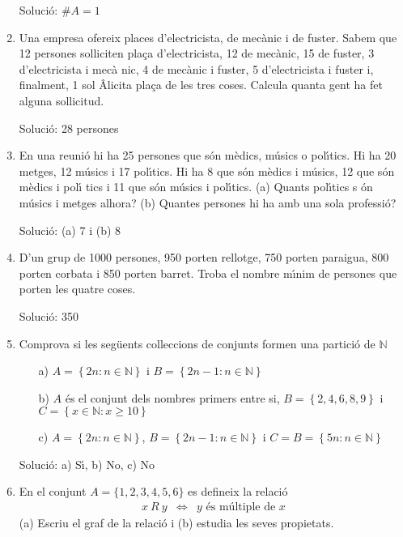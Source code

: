\begin{enumerate}
Soluci\'{o}: $\#A=1$

\item Una empresa ofereix places d'electricista, de mec\`{a}nic i de fuster.
Sabem que 12 persones sol\textperiodcentered liciten pla\c{c}a
d'electricista, 12 de mec\`{a}nic, 15 de fuster, 3 d'electricista i mec\`{a}%
nic, 4 de mec\`{a}nic i fuster, 5 d'electricista i fuster i, finalment, 1 sol%
\^{A}\textperiodcentered licita pla\c{c}a de les tres coses. Calcula quanta
gent ha fet alguna sol\textperiodcentered licitud.

Soluci\'{o}: 28 persones

\item En una reuni\'{o} hi ha 25 persones que s\'{o}n m\`{e}dics, m\'{u}sics
o pol\'{\i}tics. Hi ha 20 metges, 12 m\'{u}sics i 17 pol\'{\i}tics. Hi ha 8
que s\'{o}n m\`{e}dics i m\'{u}sics, 12 que s\'{o}n m\`{e}dics i pol\'{\i}%
tics i 11 que s\'{o}n m\'{u}sics i pol\'{\i}tics. (a) Quants pol\'{\i}tics s%
\'{o}n m\'{u}sics i metges alhora? (b) Quantes persones hi ha amb una sola
professi\'{o}?

Soluci\'{o}: (a) 7 i (b) 8

\item D'un grup de 1000 persones, 950 porten rellotge, 750 porten paraigua,
800 porten corbata i 850 porten barret. Troba el nombre m\'{\i}nim de
persones que porten les quatre coses.

Soluci\'{o}: 350

\item Comprova si les seg\"{u}ents col\textperiodcentered leccions de
conjunts formen una partici\'{o} de $\mathbb{N}$

\begin{enumerate}
\item[a)] $A=\left\{ 2n:n\in \mathbb{N}\right\} $ i $B=\left\{ 2n-1:n\in
\mathbb{N}\right\} $

\item[b)] $A$ \'{e}s el conjunt dels nombres primers entre si, $B=\left\{
2,4,6,8,9\right\} $ i $C=\left\{ x\in \mathbb{N}:x\geq 10\right\} $

\item[c)] $A=\left\{ 2n:n\in \mathbb{N}\right\} $, $B=\left\{ 2n-1:n\in
\mathbb{N}\right\} $ i $C=B=\left\{ 5n:n\in \mathbb{N}\right\} $
\end{enumerate}

Soluci\'{o}: a) S\'{\i}, b) No, c) No

\item En el conjunt $A=\{1,2,3,4,5,6\}$ es defineix la relaci\'{o}%
\begin{equation*}
\begin{array}{ccc}
x~R~y & \Longleftrightarrow & y\text{ \'{e}s m\'{u}ltiple de }x%
\end{array}%
\end{equation*}%
(a) Escriu el graf de la relaci\'{o} i (b) estudia les seves propietats.


\end{enumerate}
